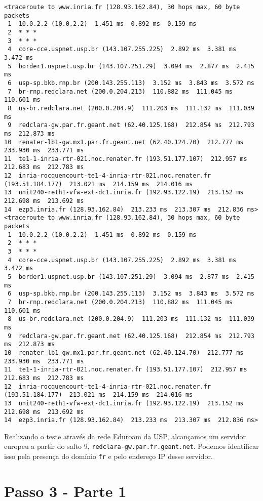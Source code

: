 \documentclass[12pt,letterpaper]{article}
\begin{document}
\begin{verbatim}
<traceroute to www.inria.fr (128.93.162.84), 30 hops max, 60 byte packets
 1  10.0.2.2 (10.0.2.2)  1.451 ms  0.892 ms  0.159 ms
 2  * * *
 3  * * *
 4  core-cce.uspnet.usp.br (143.107.255.225)  2.892 ms  3.381 ms  3.472 ms
 5  border1.uspnet.usp.br (143.107.251.29)  3.094 ms  2.877 ms  2.415 ms
 6  usp-sp.bkb.rnp.br (200.143.255.113)  3.152 ms  3.843 ms  3.572 ms
 7  br-rnp.redclara.net (200.0.204.213)  110.882 ms  111.045 ms  110.601 ms
 8  us-br.redclara.net (200.0.204.9)  111.203 ms  111.132 ms  111.039 ms
 9  redclara-gw.par.fr.geant.net (62.40.125.168)  212.854 ms  212.793 ms  212.873 ms
10  renater-lb1-gw.mx1.par.fr.geant.net (62.40.124.70)  212.777 ms  233.930 ms  233.771 ms
11  te1-1-inria-rtr-021.noc.renater.fr (193.51.177.107)  212.957 ms  212.683 ms  212.783 ms
12  inria-rocquencourt-te1-4-inria-rtr-021.noc.renater.fr (193.51.184.177)  213.021 ms  214.159 ms  214.016 ms
13  unit240-reth1-vfw-ext-dc1.inria.fr (192.93.122.19)  213.152 ms  212.698 ms  213.692 ms
14  ezp3.inria.fr (128.93.162.84)  213.233 ms  213.307 ms  212.836 ms><traceroute to www.inria.fr (128.93.162.84), 30 hops max, 60 byte packets
 1  10.0.2.2 (10.0.2.2)  1.451 ms  0.892 ms  0.159 ms
 2  * * *
 3  * * *
 4  core-cce.uspnet.usp.br (143.107.255.225)  2.892 ms  3.381 ms  3.472 ms
 5  border1.uspnet.usp.br (143.107.251.29)  3.094 ms  2.877 ms  2.415 ms
 6  usp-sp.bkb.rnp.br (200.143.255.113)  3.152 ms  3.843 ms  3.572 ms
 7  br-rnp.redclara.net (200.0.204.213)  110.882 ms  111.045 ms  110.601 ms
 8  us-br.redclara.net (200.0.204.9)  111.203 ms  111.132 ms  111.039 ms
 9  redclara-gw.par.fr.geant.net (62.40.125.168)  212.854 ms  212.793 ms  212.873 ms
10  renater-lb1-gw.mx1.par.fr.geant.net (62.40.124.70)  212.777 ms  233.930 ms  233.771 ms
11  te1-1-inria-rtr-021.noc.renater.fr (193.51.177.107)  212.957 ms  212.683 ms  212.783 ms
12  inria-rocquencourt-te1-4-inria-rtr-021.noc.renater.fr (193.51.184.177)  213.021 ms  214.159 ms  214.016 ms
13  unit240-reth1-vfw-ext-dc1.inria.fr (192.93.122.19)  213.152 ms  212.698 ms  213.692 ms
14  ezp3.inria.fr (128.93.162.84)  213.233 ms  213.307 ms  212.836 ms>
\end{verbatim}

Realizando o teste através da rede Eduroam da USP, alcançamos um servidor europeu a partir do salto 9, \newline \texttt{redclara-gw.par.fr.geant.net}.
Podemos identificar isso pela presença do domínio \texttt{fr} e pelo endereço IP desse servidor.

\section{Passo 3 - Parte 1}
\end{document}
